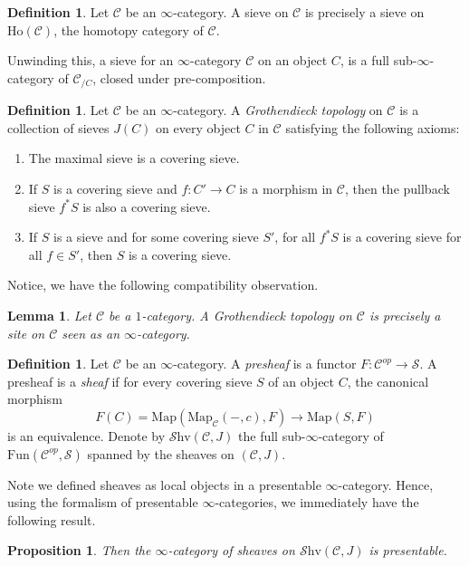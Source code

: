 \documentclass[10pt]{amsart}
\newcommand{\C}{\mathscr{C}}
\newcommand{\s}{\mathscr{S}}
\newcommand{\Map}{\mathrm{Map}}
\newcommand{\Ho}{\mathrm{Ho}}
\newcommand{\Fun}{\mathrm{Fun}}
\newcommand{\Shv}{\mathscr{S}\mathrm{hv}}
\newtheorem{lemma}[equation]{Lemma}
\newtheorem{proposition}[equation]{Proposition}
\theoremstyle{definition}
\newtheorem{definition}[equation]{Definition}
\theoremstyle{remark}
\begin{document}
\begin{definition}
  Let $\C$ be an $\infty$-category. A sieve on $\C$ is precisely a sieve on $\Ho(\C)$, the homotopy category of $\C$. 
\end{definition}

Unwinding this, a sieve for an $\infty$-category $\C$ on an object $C$, is a full sub-$\infty$-category of $\C_{/C}$, closed under pre-composition.

\begin{definition}
  Let $\C$ be an $\infty$-category. A \emph{Grothendieck topology} on $\C$ is a collection of sieves $J(C)$ on every object $C$ in $\C$ satisfying the following axioms:
  \begin{enumerate}
    \item The maximal sieve is a covering sieve.
    \item If $S$ is a covering sieve and $f\colon C' \to C$ is a morphism in $\C$, then the pullback sieve $f^*S$ is also a covering sieve.
    \item If $S$ is a sieve and for some covering sieve $S'$, for all $f^*S$ is a covering sieve for all $f \in S'$, then $S$ is a covering sieve.
  \end{enumerate}
\end{definition}

Notice, we have the following compatibility observation.
\begin{lemma}
  Let $\C$ be a $1$-category. A Grothendieck topology on $\C$ is precisely a site on $\C$ seen as an $\infty$-category.
\end{lemma}

\begin{definition}
  Let $\C$ be an $\infty$-category. A \emph{presheaf} is a functor $F : \C^{op} \to \s$. A presheaf is a \emph{sheaf} if for every covering sieve $S$ of an object $C$, the canonical morphism
  \[ F(C) = \Map(\Map_\C(-,c),F) \to \Map(S,F) \]
  is an equivalence. Denote by $\Shv(\C,J)$ the full sub-$\infty$-category of $\Fun(\C^{op},\s)$ spanned by the sheaves on $(\C,J)$.
\end{definition}

Note we defined sheaves as local objects in a presentable $\infty$-category. Hence, using the formalism of presentable $\infty$-categories, we immediately have the following result. 

\begin{proposition}
  Then the $\infty$-category of sheaves on $\Shv(\C,J)$ is presentable.
\end{proposition}
\end{document}
